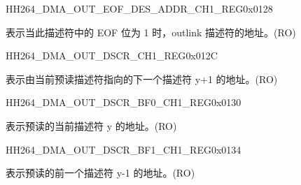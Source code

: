    
    \begin{register}{H}{H264\_DMA\_OUT\_EOF\_DES\_ADDR\_CH1\_REG}{0x0128}\label{regdesc:H264DMAOUTEOFDESADDRCH1REG}
    \regnewline%
    \begin{regdesc}\begin{reglist}
    \label{fielddesc:H264DMAOUTEOFDESADDRCH1}\item [H264\_DMA\_OUT\_EOF\_DES\_ADDR\_CH1] 表示当此描述符中的 EOF 位为 1 时，outlink 描述符的地址。(RO)
    \end{reglist}\end{regdesc}
    \end{register}
    
    
    \begin{register}{H}{H264\_DMA\_OUT\_DSCR\_CH1\_REG}{0x012C}\label{regdesc:H264DMAOUTDSCRCH1REG}
    \regnewline%
    \begin{regdesc}\begin{reglist}
    \label{fielddesc:H264DMAOUTLINKDSCRCH1}\item [H264\_DMA\_OUTLINK\_DSCR\_CH1] 表示由当前预读描述符指向的下一个描述符 y+1 的地址。(RO)
    \end{reglist}\end{regdesc}
    \end{register}
    
    
    \begin{register}{H}{H264\_DMA\_OUT\_DSCR\_BF0\_CH1\_REG}{0x0130}\label{regdesc:H264DMAOUTDSCRBF0CH1REG}
    \regnewline%
    \begin{regdesc}\begin{reglist}
    \label{fielddesc:H264DMAOUTLINKDSCRBF0CH1}\item [H264\_DMA\_OUTLINK\_DSCR\_BF0\_CH1] 表示预读的当前描述符 y 的地址。(RO)
    \end{reglist}\end{regdesc}
    \end{register}
    
    
    \begin{register}{H}{H264\_DMA\_OUT\_DSCR\_BF1\_CH1\_REG}{0x0134}\label{regdesc:H264DMAOUTDSCRBF1CH1REG}
    \regnewline%
    \begin{regdesc}\begin{reglist}
    \label{fielddesc:H264DMAOUTLINKDSCRBF1CH1}\item [H264\_DMA\_OUTLINK\_DSCR\_BF1\_CH1] 表示预读的前一个描述符 y-1 的地址。(RO)
    \end{reglist}\end{regdesc}
    \end{register}
    
